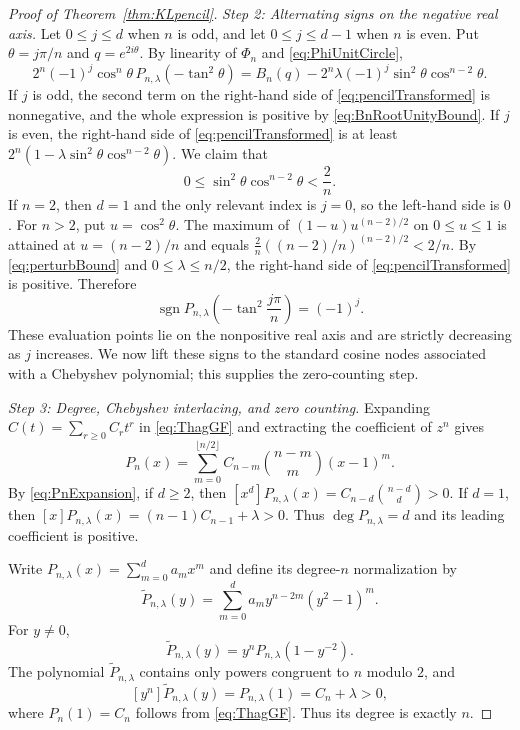 \documentclass[11pt]{article}
\theoremstyle{plain}
\theoremstyle{remark}
\DeclareMathOperator{\sgn}{sgn}
\begin{document}
\begin{proof}[Proof of Theorem~\ref{thm:KLpencil}]
\medskip
\noindent\emph{Step 2: Alternating signs on the negative real axis.}
Let $0\le j\le d$ when $n$ is odd, and let $0\le j\le d-1$ when
$n$ is even.  Put
$\theta=j\pi/n$ and $q=e^{2i\theta}$.  By linearity of $\Phi_n$ and
\eqref{eq:PhiUnitCircle},
\begin{equation}\label{eq:pencilTransformed}
2^n(-1)^j\cos^n\theta\,
P_{n,\lambda}(-\tan^2\theta)
=B_n(q)-2^n\lambda(-1)^j
\sin^2\theta\cos^{n-2}\theta.
\end{equation}
If $j$ is odd, the second term on the right-hand side of
\eqref{eq:pencilTransformed} is nonnegative, and the whole expression
is positive by \eqref{eq:BnRootUnityBound}.  If $j$ is even, the
right-hand side of \eqref{eq:pencilTransformed} is at least
$2^n(1-\lambda\sin^2\theta\cos^{n-2}\theta)$.  We claim that
\begin{equation}\label{eq:perturbBound}
0\le\sin^2\theta\cos^{n-2}\theta<\frac2n.
\end{equation}
If $n=2$, then $d=1$ and the only relevant index is $j=0$, so the
left-hand side is $0$.  For $n>2$, put
$u=\cos^2\theta$.  The maximum of
$(1-u)u^{(n-2)/2}$ on $0\le u\le1$ is attained at
$u=(n-2)/n$ and equals
$\frac2n((n-2)/n)^{(n-2)/2}<2/n$.  By
\eqref{eq:perturbBound} and $0\le\lambda\le n/2$, the right-hand
side of \eqref{eq:pencilTransformed} is positive.  Therefore
\begin{equation}\label{eq:pencilSign}
\sgn P_{n,\lambda}\!\left(-\tan^2\frac{j\pi}{n}\right)=(-1)^j.
\end{equation}
These evaluation points lie on the nonpositive real axis and are
strictly decreasing as $j$ increases.  We now lift these signs to the
standard cosine nodes associated with a Chebyshev polynomial; this
supplies the zero-counting step.

\medskip
\noindent\emph{Step 3: Degree, Chebyshev interlacing, and zero counting.}
Expanding $C(t)=\sum_{r\ge0}C_rt^r$ in \eqref{eq:ThagGF} and
extracting the coefficient of $z^n$ gives
\begin{equation}\label{eq:PnExpansion}
P_n(x)=\sum_{m=0}^{\lfloor n/2\rfloor}
C_{n-m}\binom{n-m}{m}(x-1)^m.
\end{equation}
By \eqref{eq:PnExpansion}, if $d\ge2$, then
$[x^d]P_{n,\lambda}(x)=C_{n-d}\binom{n-d}{d}>0$.  If $d=1$, then
$[x]P_{n,\lambda}(x)=(n-1)C_{n-1}+\lambda>0$.  Thus
$\deg P_{n,\lambda}=d$ and its leading coefficient is positive.

Write $P_{n,\lambda}(x)=\sum_{m=0}^d a_mx^m$ and define its
degree-$n$ normalization by
\begin{equation}\label{eq:normalizedP}
\widetilde P_{n,\lambda}(y)
=\sum_{m=0}^d a_m y^{n-2m}(y^2-1)^m.
\end{equation}
For $y\ne0$,
\begin{equation}\label{eq:normalizedPRational}
\widetilde P_{n,\lambda}(y)
=y^nP_{n,\lambda}(1-y^{-2}).
\end{equation}
The polynomial $\widetilde P_{n,\lambda}$ contains only powers
congruent to $n$ modulo $2$, and
\[
[y^n]\widetilde P_{n,\lambda}(y)
=P_{n,\lambda}(1)=C_n+\lambda>0,
\]
where $P_n(1)=C_n$ follows from \eqref{eq:ThagGF}.  Thus its degree
is exactly $n$.


\end{proof}
\end{document}
